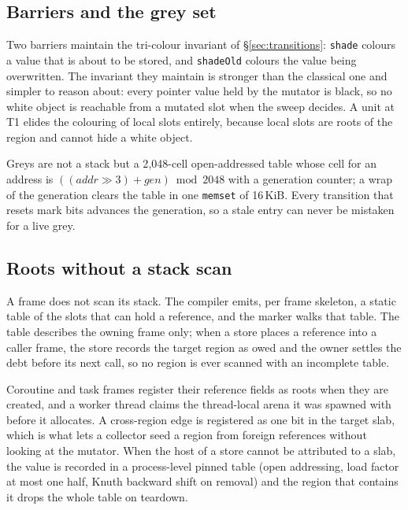 \subsection{Barriers and the grey set}
\label{sec:impl-barrier}

Two barriers maintain the tri-colour invariant of \S\ref{sec:transitions}: \texttt{shade}
colours a value that is about to be stored, and \texttt{shadeOld} colours the value being
overwritten.  The invariant they maintain is stronger than the classical one and simpler to
reason about: every pointer value held by the mutator is black, so no white object is reachable
from a mutated slot when the sweep decides.  A unit at T1 elides the colouring of local slots
entirely, because local slots are roots of the region and cannot hide a white object.

Greys are not a stack but a 2{,}048-cell open-addressed table whose cell for an address is
$((addr\gg3)+gen) \bmod 2048$ with a generation counter; a wrap of the generation clears the
table in one \texttt{memset} of 16\,KiB.  Every transition that resets mark bits advances the
generation, so a stale entry can never be mistaken for a live grey.

\subsection{Roots without a stack scan}
\label{sec:impl-roots}

A frame does not scan its stack.  The compiler emits, per frame skeleton, a static table of the
slots that can hold a reference, and the marker walks that table.  The table describes the owning
frame only; when a store places a reference into a caller frame, the store records the target
region as owed and the owner settles the debt before its next call, so no region is ever scanned
with an incomplete table.

Coroutine and task frames register their reference fields as roots when they are created, and a
worker thread claims the thread-local arena it was spawned with before it allocates.  A
cross-region edge is registered as one bit in the target slab, which is what lets a collector seed
a region from foreign references without looking at the mutator.  When the host of a store cannot
be attributed to a slab, the value is recorded in a process-level pinned table (open addressing,
load factor at most one half, Knuth backward shift on removal) and the region that contains it
drops the whole table on teardown.

